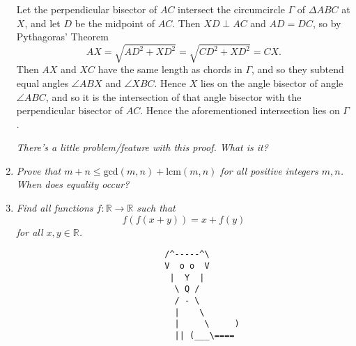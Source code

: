 \documentclass{article}
\begin{document}
\begin{enumerate}[1.]
Let the perpendicular bisector of $AC$ intersect the circumcircle $\Gamma$ of $\Delta ABC$ at $X$, and let $D$ be the midpoint of $AC$. Then $XD \perp AC$ and $AD = DC$, so by Pythagoras' Theorem \[ AX = \sqrt{AD^2+XD^2} = \sqrt{CD^2+XD^2} = CX. \]
Then $AX$ and $XC$ have the same length as chords in $\Gamma$, and so they subtend equal angles $\angle ABX$ and $\angle XBC$. Hence $X$ lies on the angle bisector of angle $\angle ABC$, and so it is the intersection of that angle bisector with the perpendicular bisector of $AC$. Hence the aforementioned intersection lies on $\Gamma$.

{\footnotesize \textit{There's a little problem/feature with this proof. What is it?}}


\vspace{12pt}
\item %
\textit{Prove that $m + n \leq \textrm{gcd}(m, n) + \textrm{lcm}(m, n)$ for all positive integers $m, n$. When does equality occur?}




\vspace{12pt}
\item %
\textit{Find all functions $f : \mathbb{R} \to \mathbb{R}$ such that
$$ f(f(x+y)) = x + f(y) $$
for all $x, y \in \mathbb{R}$.}



\end{enumerate}


\begin{center}
\begin{verbatim}
                                 /^-----^\
                                 V  o o  V
                                  |  Y  |
                                   \ Q /
                                   / - \
                                   |    \
                                   |     \     )
                                   || (___\====
\end{verbatim}
\end{center}
\end{document}
